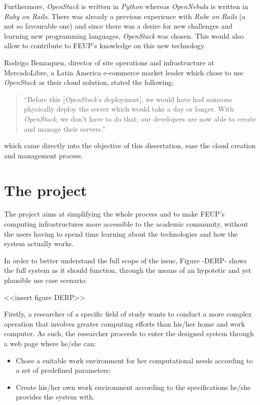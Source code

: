 Furthermore, \textit{OpenStack} is written in \textit{Python} whereas \textit{OpenNebula} is written in \textit{Ruby on Rails}. There was already a previous experience with \textit{Rube on Rails} (a not so favourable one) and since there was a desire for new challenges and learning new programming languages, \textit{OpenStack} was chosen. This would also allow to contribute to FEUP's knowledge on this new technology.

Rodrigo Benzaquen, director of site operations and infrastructure at MercadoLibre, a Latin America e-commerce market leader which chose to use \textit{OpenStack} as their cloud solution, stated the following:

\begin{quote}
 ``Before this [\textit{OpenStack}'s deployment], we would have had someone physically deploy the server which would take a day or longer. With \textit{OpenStack}, we don't have to do that; our developers are now able to create and manage their servers.''\cite{openstack_userstories}
\end{quote}

which came directly into the objective of this dissertation, ease the cloud creation and management process.

\section{The project} \label{sec:project}


The project aims at simplifying the whole process and to make FEUP's computing infrastructures more accessible to the academic community, without the users having to spend time learning about the technologies and how the system actually works.

In order to better understand the full scope of the issue, Figure -DERP- shows the full system as it should function, through the means of an hypotetic and yet plausible use case scenario:

<<insert figure DERP>>

Firstly, a researcher of a specific field of study wants to conduct a more complex operation that involves greater computing efforts than his/her home and work computer. As such, the researcher proceeds to enter the designed system through a web page where he/she can:

\begin{itemize}
	\item Chose a suitable work environment for her computational needs according to a set of predefined parameters;
	\item Create his/her own work environment according to the specifications he/she provides the system with.
\end{itemize}


